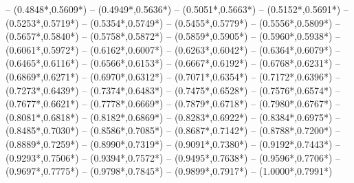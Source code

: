 {	-- ({0.4848*\dx},{0.5609*\dy}) %
	-- ({0.4949*\dx},{0.5636*\dy}) %
	-- ({0.5051*\dx},{0.5663*\dy}) %
	-- ({0.5152*\dx},{0.5691*\dy}) %
	-- ({0.5253*\dx},{0.5719*\dy}) %
	-- ({0.5354*\dx},{0.5749*\dy}) %
	-- ({0.5455*\dx},{0.5779*\dy}) %
	-- ({0.5556*\dx},{0.5809*\dy}) %
	-- ({0.5657*\dx},{0.5840*\dy}) %
	-- ({0.5758*\dx},{0.5872*\dy}) %
	-- ({0.5859*\dx},{0.5905*\dy}) %
	-- ({0.5960*\dx},{0.5938*\dy}) %
	-- ({0.6061*\dx},{0.5972*\dy}) %
	-- ({0.6162*\dx},{0.6007*\dy}) %
	-- ({0.6263*\dx},{0.6042*\dy}) %
	-- ({0.6364*\dx},{0.6079*\dy}) %
	-- ({0.6465*\dx},{0.6116*\dy}) %
	-- ({0.6566*\dx},{0.6153*\dy}) %
	-- ({0.6667*\dx},{0.6192*\dy}) %
	-- ({0.6768*\dx},{0.6231*\dy}) %
	-- ({0.6869*\dx},{0.6271*\dy}) %
	-- ({0.6970*\dx},{0.6312*\dy}) %
	-- ({0.7071*\dx},{0.6354*\dy}) %
	-- ({0.7172*\dx},{0.6396*\dy}) %
	-- ({0.7273*\dx},{0.6439*\dy}) %
	-- ({0.7374*\dx},{0.6483*\dy}) %
	-- ({0.7475*\dx},{0.6528*\dy}) %
	-- ({0.7576*\dx},{0.6574*\dy}) %
	-- ({0.7677*\dx},{0.6621*\dy}) %
	-- ({0.7778*\dx},{0.6669*\dy}) %
	-- ({0.7879*\dx},{0.6718*\dy}) %
	-- ({0.7980*\dx},{0.6767*\dy}) %
	-- ({0.8081*\dx},{0.6818*\dy}) %
	-- ({0.8182*\dx},{0.6869*\dy}) %
	-- ({0.8283*\dx},{0.6922*\dy}) %
	-- ({0.8384*\dx},{0.6975*\dy}) %
	-- ({0.8485*\dx},{0.7030*\dy}) %
	-- ({0.8586*\dx},{0.7085*\dy}) %
	-- ({0.8687*\dx},{0.7142*\dy}) %
	-- ({0.8788*\dx},{0.7200*\dy}) %
	-- ({0.8889*\dx},{0.7259*\dy}) %
	-- ({0.8990*\dx},{0.7319*\dy}) %
	-- ({0.9091*\dx},{0.7380*\dy}) %
	-- ({0.9192*\dx},{0.7443*\dy}) %
	-- ({0.9293*\dx},{0.7506*\dy}) %
	-- ({0.9394*\dx},{0.7572*\dy}) %
	-- ({0.9495*\dx},{0.7638*\dy}) %
	-- ({0.9596*\dx},{0.7706*\dy}) %
	-- ({0.9697*\dx},{0.7775*\dy}) %
	-- ({0.9798*\dx},{0.7845*\dy}) %
	-- ({0.9899*\dx},{0.7917*\dy}) %
	-- ({1.0000*\dx},{0.7991*\dy}) %
}
